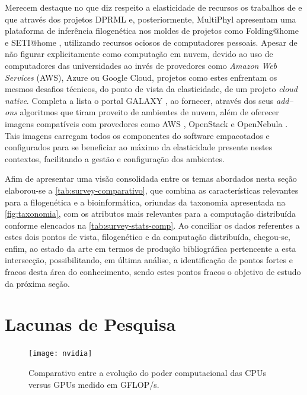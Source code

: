 \documentclass[english,brazilian]{UNISINOSmonografia} %
\newcommand\defaultFigureWidth{0.9}
\begin{document}
Merecem destaque no que diz respeito a elasticidade de recursos os trabalhos de  e  que através dos projetos DPRML e, posteriormente, MultiPhyl apresentam uma plataforma de inferência filogenética nos moldes de projetos como Folding@home \cite{Shirts2000,Larson2002} e SETI@home \cite{Korpela2001}, utilizando recursos ociosos de computadores pessoais.
Apesar de não figurar explicitamente como computação em nuvem, devido ao uso de computadores das universidades ao invés de provedores como \textit{Amazon Web Services} (AWS), Azure ou Google Cloud, projetos como estes enfrentam os mesmos desafios técnicos, do ponto de vista da elasticidade, de um projeto \textit{cloud native}.
Completa a lista o portal GALAXY \cite{Afgan2016}, ao fornecer, através dos seus \textit{add--ons} algoritmos que tiram proveito de ambientes de nuvem, além de oferecer imagens compatíveis com provedores como AWS \cite{Varia2017}, OpenStack \cite{Sefraoui2012} e OpenNebula \cite{Milojicic2011}.
Tais imagens carregam todos os componentes do software empacotados e configurados para se beneficiar ao máximo da elasticidade presente nestes contextos, facilitando a gestão e configuração dos ambientes.


Afim de apresentar uma visão consolidada entre os temas abordados nesta seção elaborou-se a \autoref{tab:survey-comparativo}, que combina as características relevantes para a filogenética e a bioinformática, oriundas da taxonomia apresentada na \autoref{fig:taxonomia}, com os atributos mais relevantes para a computação distribuída conforme elencados na \autoref{tab:survey-stats-comp}.
Ao conciliar os dados referentes a estes dois pontos de vista, filogenético e da computação distribuída, chegou-se, enfim, ao estado da arte em termos de produção bibliográfica pertencente a esta intersecção, possibilitando, em última análise, a identificação de pontos fortes e fracos desta área do conhecimento, sendo estes pontos fracos o objetivo de estudo da próxima seção.




\section{Lacunas de Pesquisa}
\label{sec:lacunas-de-pesquisa}


\begin{figure}[tb]
	\centering%
	\begin{minipage}{\defaultFigureWidth\textwidth}
		\caption{Comparativo entre a evolução do poder computacional das CPUs versus GPUs medido em GFLOP/s.}
		\label{fig:gpu-power}
		\vspace{1ex}
		\texttt{[image: nvidia]}
	\end{minipage}
\end{figure}
\end{document}

